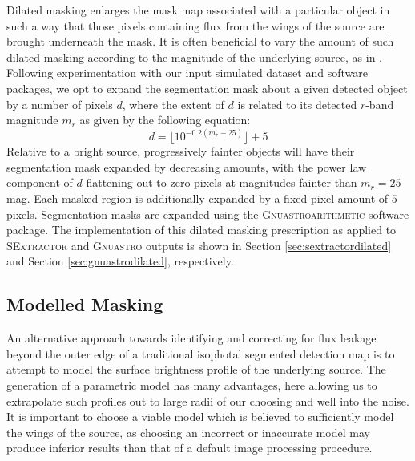 \documentclass[fleqn,usenatbib,useAMS]{mnras}
\newcommand*{\SExtractor}{\textsc{SExtractor}\xspace}
\newcommand*{\Gnuastro}{\textsc{Gnuastro}\xspace}
\begin{document}
Dilated masking enlarges the mask map associated with a particular object in such a way that those pixels containing flux from the wings of the source are brought underneath the mask. It is often beneficial to vary the amount of such dilated masking according to the magnitude of the underlying source, as in \citet{Ji2018}. Following experimentation with our input simulated dataset and software packages, we opt to expand the segmentation mask about a given detected object by a number of pixels $d$, where the extent of $d$ is related to its detected $r$-band magnitude $m_r$ as given by the following equation:
\begin{equation}
    \label{eq:dilmask}
    d = \lfloor10^{-0.2\left(m_r-25\right)}\rfloor + 5
\end{equation}
Relative to a bright source, progressively fainter objects will have their segmentation mask expanded by decreasing amounts, with the power law component of $d$ flattening out to zero pixels at magnitudes fainter than $m_r=25$ mag. Each masked region is additionally expanded by a fixed pixel amount of $5$ pixels. Segmentation masks are expanded using the \Gnuastro \textsc{arithmetic} software package. The implementation of this dilated masking prescription as applied to \SExtractor and \Gnuastro outputs is shown in Section \ref{sec:sextractordilated} and Section \ref{sec:gnuastrodilated}, respectively. 

\subsection{Modelled Masking}
\label{sec:modelledmasking}

An alternative approach towards identifying and correcting for flux leakage beyond the outer edge of a traditional isophotal segmented detection map is to attempt to model the surface brightness profile of the underlying source. The generation of a parametric model has many advantages, here allowing us to extrapolate such profiles out to large radii of our choosing and well into the noise. It is important to choose a viable model which is believed to sufficiently model the wings of the source, as choosing an incorrect or inaccurate model may produce inferior results than that of a default image processing procedure. 
\end{document}
